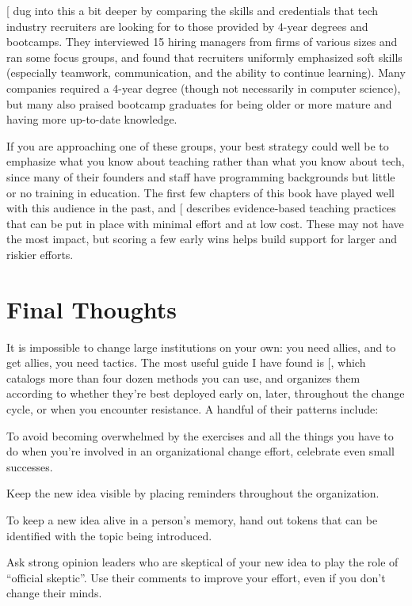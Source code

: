 {[}\protect[\hyperlink{b:Burk2018}{Burk2018}]{]} dug into this a bit deeper by comparing the skills
and credentials that tech industry recruiters are looking for to those
provided by 4-year degrees and bootcamps. They interviewed 15 hiring
managers from firms of various sizes and ran some focus groups, and
found that recruiters uniformly emphasized soft skills (especially
teamwork, communication, and the ability to continue learning). Many
companies required a 4-year degree (though not necessarily in computer
science), but many also praised bootcamp graduates for being older or
more mature and having more up-to-date knowledge.

If you are approaching one of these groups, your best strategy could
well be to emphasize what you know about teaching rather than what you
know about tech, since many of their founders and staff have programming
backgrounds but little or no training in education. The first few
chapters of this book have played well with this audience in the past,
and {[}\protect[\hyperlink{b:Lang2016}{Lang2016}]{]} describes evidence-based teaching practices that
can be put in place with minimal effort and at low cost. These may not
have the most impact, but scoring a few early wins helps build support
for larger and riskier efforts.

\section{Final Thoughts}\label{s:partner-final}

It is impossible to change large institutions on your own: you need
allies, and to get allies, you need tactics. The most useful guide I
have found is {[}\protect[\hyperlink{b:Mann2015}{Mann2015}]{]}, which catalogs more than four dozen
methods you can use, and organizes them according to whether they're
best deployed early on, later, throughout the change cycle, or when you
encounter resistance. A handful of their patterns include:

\begin{description}
\tightlist
\item[Small Successes:]
To avoid becoming overwhelmed by the exercises and all the things
you have to do when you're involved in an organizational change
effort, celebrate even small successes.
\item[In Your Space:]
Keep the new idea visible by placing reminders throughout the
organization.
\item[Token:]
To keep a new idea alive in a person's memory, hand out tokens that
can be identified with the topic being introduced.
\item[Champion Skeptic:]
Ask strong opinion leaders who are skeptical of your new idea to
play the role of ``official skeptic''. Use their comments to improve
your effort, even if you don't change their minds.
\end{description}

